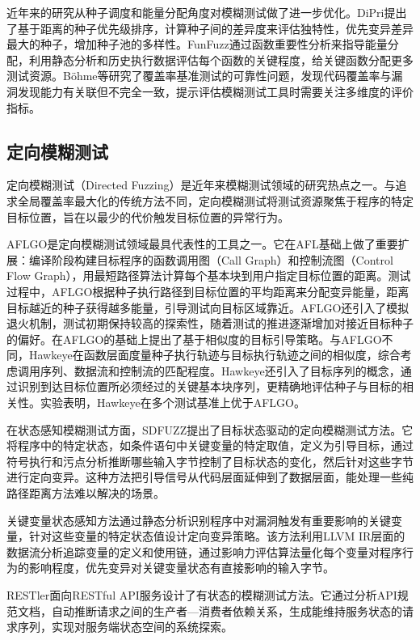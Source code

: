 \documentclass[bachelor]{njupthesis}
\begin{document}
近年来的研究从种子调度和能量分配角度对模糊测试做了进一步优化。DiPri\cite{DiPri}提出了基于距离的种子优先级排序，计算种子间的差异度来评估独特性，优先变异差异最大的种子，增加种子池的多样性。FunFuzz\cite{FunFuzz}通过函数重要性分析来指导能量分配，利用静态分析和历史执行数据评估每个函数的关键程度，给关键函数分配更多测试资源。Böhme等\cite{reliable_benchmark}研究了覆盖率基准测试的可靠性问题，发现代码覆盖率与漏洞发现能力有关联但不完全一致，提示评估模糊测试工具时需要关注多维度的评价指标。

\subsection{定向模糊测试}

定向模糊测试（Directed Fuzzing）是近年来模糊测试领域的研究热点之一。与追求全局覆盖率最大化的传统方法不同，定向模糊测试将测试资源聚焦于程序的特定目标位置，旨在以最少的代价触发目标位置的异常行为\cite{directedGreybox}。

AFLGO是定向模糊测试领域最具代表性的工具之一\cite{directedGreybox}。它在AFL基础上做了重要扩展：编译阶段构建目标程序的函数调用图（Call Graph）和控制流图（Control Flow Graph），用最短路径算法计算每个基本块到用户指定目标位置的距离。测试过程中，AFLGO根据种子执行路径到目标位置的平均距离来分配变异能量，距离目标越近的种子获得越多能量，引导测试向目标区域靠近。AFLGO还引入了模拟退火机制，测试初期保持较高的探索性，随着测试的推进逐渐增加对接近目标种子的偏好。\cite{Hawkeye}在AFLGO的基础上提出了基于相似度的目标引导策略。与AFLGO不同，Hawkeye在函数层面度量种子执行轨迹与目标执行轨迹之间的相似度，综合考虑调用序列、数据流和控制流的匹配程度。Hawkeye还引入了目标序列的概念，通过识别到达目标位置所必须经过的关键基本块序列，更精确地评估种子与目标的相关性。实验表明，Hawkeye在多个测试基准上优于AFLGO。

在状态感知模糊测试方面，SDFUZZ\cite{SDFUZZ}提出了目标状态驱动的定向模糊测试方法。它将程序中的特定状态，如条件语句中关键变量的特定取值，定义为引导目标，通过符号执行和污点分析推断哪些输入字节控制了目标状态的变化，然后针对这些字节进行定向变异。这种方法把引导信号从代码层面延伸到了数据层面，能处理一些纯路径距离方法难以解决的场景。

关键变量状态感知方法\cite{criticalVar}通过静态分析识别程序中对漏洞触发有重要影响的关键变量，针对这些变量的特定状态值设计定向变异策略。该方法利用LLVM IR层面的数据流分析追踪变量的定义和使用链，通过影响力评估算法量化每个变量对程序行为的影响程度，优先变异对关键变量状态有直接影响的输入字节。

RESTler\cite{RESTler}面向RESTful API服务设计了有状态的模糊测试方法。它通过分析API规范文档，自动推断请求之间的生产者—消费者依赖关系，生成能维持服务状态的请求序列，实现对服务端状态空间的系统探索。
\end{document}
